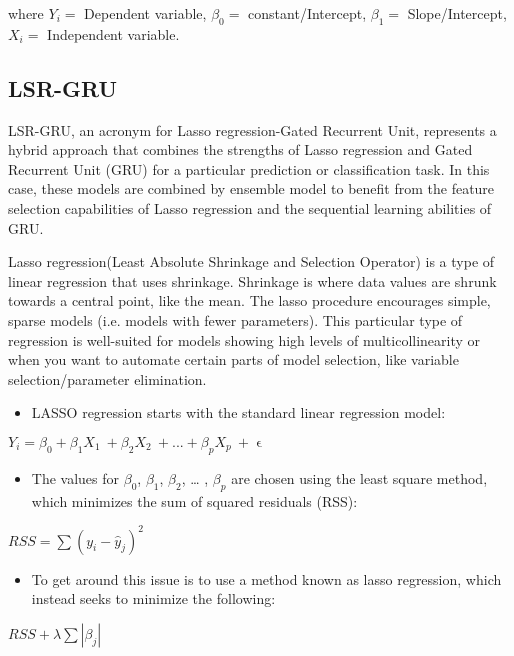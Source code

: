 \documentclass{ieeeojies}
\begin{document}
where \(Y_i=\) Dependent variable,  \(\beta_0=\) constant/Intercept, \(\beta_1=\) Slope/Intercept, \(X_i =\) Independent variable.

\subsection{LSR-GRU}
LSR-GRU, an acronym for Lasso regression-Gated Recurrent Unit, represents a hybrid approach that combines the strengths of Lasso regression and Gated Recurrent Unit (GRU) for a particular prediction or classification task. In this case, these models are combined by ensemble model to benefit from the feature selection capabilities of Lasso regression and the sequential learning abilities of GRU.

Lasso regression(Least Absolute Shrinkage and Selection Operator) is a type of linear regression that uses shrinkage. Shrinkage is where data values are shrunk towards a central point, like the mean. The lasso procedure encourages simple, sparse models (i.e. models with fewer parameters). This particular type of regression is well-suited for models showing high levels of multicollinearity or when you want to automate certain parts of model selection, like variable selection/parameter elimination. \cite{r8}

\begin{itemize}
    \item LASSO regression starts with the standard linear regression model:
\end{itemize}
\begin{center}
    \(Y_i = \beta_0 + \beta_1 X_1\ + \beta_2 X_2\ + ... + \beta_p X_p\ + \upvarepsilon\)
\end{center}
\begin{itemize}
    \item The values for $\beta_0$, $\beta_1$, $\beta_2$, … , $\beta_p$ are chosen using the least square method, which minimizes the sum of squared residuals (RSS):
\end{itemize}
\begin{center}
    \(RSS = \sum (y_i - \hat{y}_j)^2\)
\end{center}
\begin{itemize}
    \item To get around this issue is to use a method known as lasso regression, which instead seeks to minimize the following:
\end{itemize}
\begin{center}
    \(RSS + \lambda \sum|\beta_j|\)
\end{center}
\end{document}
